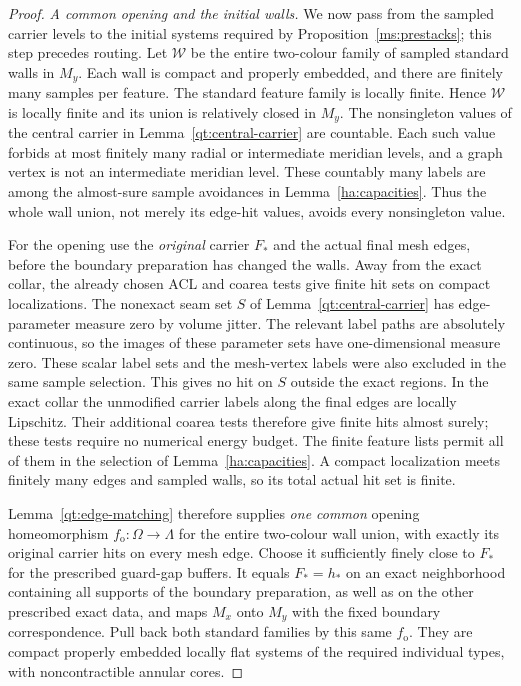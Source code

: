 \documentclass[11pt]{article}
\numberwithin{equation}{section}
\theoremstyle{definition}
\theoremstyle{remark}
\begin{document}
\begin{proof}
\emph{A common opening and the initial walls.}
We now pass from the sampled carrier levels to the initial systems
required by Proposition~\ref{ms:prestacks}; this step precedes routing.
Let $\mathcal W$ be the entire two-colour family of sampled standard
walls in $M_y$.  Each wall is compact and properly embedded, and
there are finitely many samples per feature.  The standard feature
family is locally finite.  Hence $\mathcal W$ is locally finite and
its union is relatively closed in $M_y$.  The nonsingleton values
of the central carrier in Lemma~\ref{qt:central-carrier} are
countable.  Each such value forbids at most finitely many radial
or intermediate meridian levels, and a graph vertex is not an
intermediate meridian level.  These countably many labels are among
the almost-sure sample avoidances in Lemma~\ref{ha:capacities}.
Thus the whole wall union,
not merely its edge-hit values, avoids every nonsingleton value.

For the opening use the \emph{original} carrier $F_*$ and the
actual final mesh edges, before the boundary preparation has
changed the walls.  Away from the exact collar, the already chosen
ACL and coarea tests give finite hit sets on compact localizations.
The nonexact seam set $S$ of Lemma~\ref{qt:central-carrier} has
edge-parameter measure zero by volume jitter.  The relevant label
paths are absolutely continuous, so the images of these parameter
sets have one-dimensional measure zero.  These scalar label sets
and the mesh-vertex labels were also excluded in the same sample
selection.  This gives no hit on $S$ outside the exact regions.
In the exact collar the unmodified carrier labels along the final
edges are locally Lipschitz.  Their additional coarea tests therefore
give finite hits almost surely; these tests require no numerical
energy budget.  The finite feature lists permit all of them in
the selection of Lemma~\ref{ha:capacities}.  A
compact localization meets finitely many edges and sampled walls,
so its total actual hit set is finite.

Lemma~\ref{qt:edge-matching} therefore supplies \emph{one common}
opening homeomorphism $f_{\mathrm o}:\Omega\to\Lambda$ for the
entire two-colour wall union, with exactly its original carrier
hits on every mesh edge.  Choose it sufficiently finely close to
$F_*$ for the prescribed guard-gap buffers.  It equals $F_*=h_*$
on an exact neighborhood containing all supports of the boundary
preparation, as well as on the other prescribed exact data, and
maps $M_x$ onto $M_y$ with the fixed boundary correspondence.
Pull back both standard families by this same $f_{\mathrm o}$.
They are compact properly embedded locally flat systems of the
required individual types, with noncontractible annular cores.


\end{proof}
\end{document}
